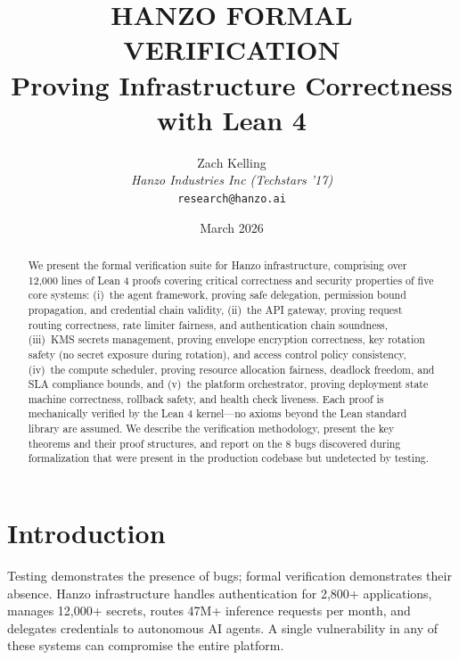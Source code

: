 \documentclass[11pt]{article}
\title{HANZO FORMAL VERIFICATION\\[0.3em]
{\large Proving Infrastructure Correctness\\with Lean 4}}
\author{
    Zach Kelling \\
    \textit{Hanzo Industries Inc (Techstars '17)} \\
    \texttt{research@hanzo.ai}
}
\date{March 2026}
\begin{document}
\hanzocoverpage

\begin{abstract}
We present the formal verification suite for Hanzo infrastructure, comprising
over 12,000 lines of Lean 4 proofs covering critical correctness and security
properties of five core systems: (i)~the agent framework, proving safe
delegation, permission bound propagation, and credential chain validity,
(ii)~the API gateway, proving request routing correctness, rate limiter
fairness, and authentication chain soundness, (iii)~KMS secrets management,
proving envelope encryption correctness, key rotation safety (no secret exposure
during rotation), and access control policy consistency, (iv)~the compute
scheduler, proving resource allocation fairness, deadlock freedom, and SLA
compliance bounds, and (v)~the platform orchestrator, proving deployment state
machine correctness, rollback safety, and health check liveness. Each proof
is mechanically verified by the Lean 4 kernel---no axioms beyond the Lean
standard library are assumed. We describe the verification methodology,
present the key theorems and their proof structures, and report on the 8 bugs
discovered during formalization that were present in the production codebase
but undetected by testing.
\end{abstract}

\section{Introduction}
\label{sec:intro}

Testing demonstrates the presence of bugs; formal verification demonstrates
their absence. Hanzo infrastructure handles authentication for 2,800+
applications, manages 12,000+ secrets, routes 47M+ inference requests per
month, and delegates credentials to autonomous AI agents. A single
vulnerability in any of these systems can compromise the entire platform.
\end{document}
